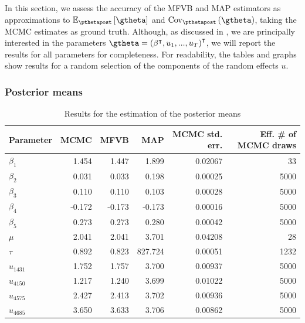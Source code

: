 \documentclass{article}\usepackage[]{graphicx}\usepackage[]{color}
\theoremstyle{plain}
\theoremstyle{definition}
\theoremstyle{plain}
\theoremstyle{plain}
\theoremstyle{plain}
\theoremstyle{plain}
\begin{document}
In this section, we assess the accuracy of the MFVB and MAP estimators
as approximations to $\epgtheta$ and $\cov_{\pthetapost}\left(\gtheta\right)$,
taking the MCMC estimates as ground truth. Although, as discussed
in , we are principally interested in
the parameters $\gtheta=\left(\beta^{\trans},u_{1},...,u_{T}\right)^{\trans}$,
we will report the results for all parameters for completeness. For
readability, the tables and graphs show results for a random selection
of the components of the random effects $u$.

\subsubsection{Posterior means}

\begin{table}
\begin{center}%
\begin{tabular}{lrrrrr}
  \hline
Parameter & MCMC & MFVB & MAP & MCMC std. err. & Eff. \# of MCMC draws \\ 
  \hline
$\beta_{1}$ & 1.454 & 1.447 & 1.899 & 0.02067 & 33 \\ 
  $\beta_{2}$ & 0.031 & 0.033 & 0.198 & 0.00025 & 5000 \\ 
  $\beta_{3}$ & 0.110 & 0.110 & 0.103 & 0.00028 & 5000 \\ 
  $\beta_{4}$ & -0.172 & -0.173 & -0.173 & 0.00016 & 5000 \\ 
  $\beta_{5}$ & 0.273 & 0.273 & 0.280 & 0.00042 & 5000 \\ 
  $\mu$ & 2.041 & 2.041 & 3.701 & 0.04208 & 28 \\ 
  $\tau$ & 0.892 & 0.823 & 827.724 & 0.00051 & 1232 \\ 
  $u_{1431}$ & 1.752 & 1.757 & 3.700 & 0.00937 & 5000 \\ 
  $u_{4150}$ & 1.217 & 1.240 & 3.699 & 0.01022 & 5000 \\ 
  $u_{4575}$ & 2.427 & 2.413 & 3.702 & 0.00936 & 5000 \\ 
  $u_{4685}$ & 3.650 & 3.633 & 3.706 & 0.00862 & 5000 \\ 
   \hline
\end{tabular}
\end{center}
\caption{Results for the estimation of the posterior means\label{tab:mean_results}}
\end{table}
\end{document}
